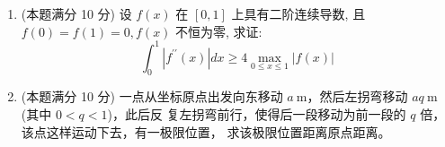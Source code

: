 \begin{enumerate}


\item 
(本题满分 10 分)
设 $f(x)$ 在 $[0,1]$ 上具有二阶连续导数, 且 $f(0)=f(1)=0, f(x)$ 不恒为零, 求证:
$$
\int_{0}^{1}\left|f^{\prime \prime}(x)\right| d x \geqslant 4 \max _{0 \leqslant x \leqslant 1}|f(x)|
$$




\item 
(本题满分 10 分)
一点从坐标原点出发向东移动 $ a \ \mathrm{m} $，然后左拐弯移动 $ aq \ \mathrm{m} $(其中 $ 0<q<1 $)，此后反
复左拐弯前行，使得后一段移动为前一段的 $ q $ 倍，该点这样运动下去，有一极限位置，
求该极限位置距离原点距离。






\end{enumerate}

